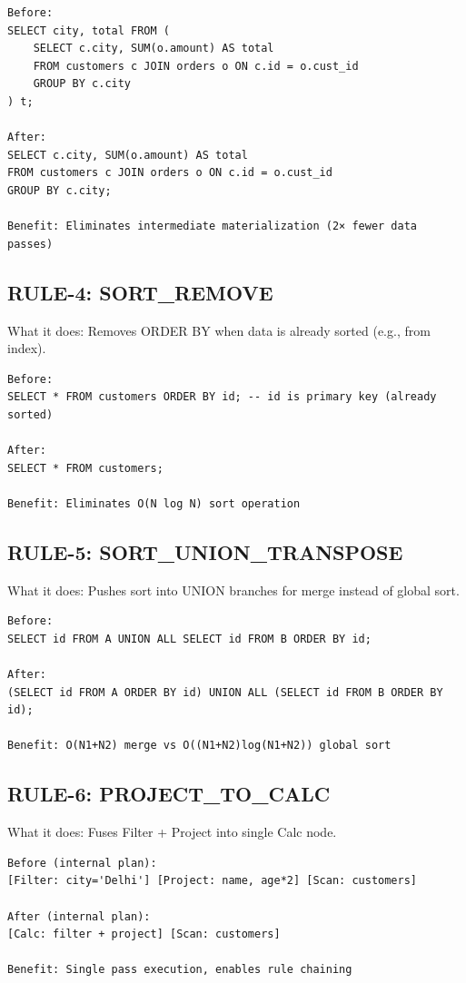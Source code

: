 \documentclass[12pt,a4paper]{article}
\begin{document}
\begin{verbatim}
Before:
SELECT city, total FROM (
    SELECT c.city, SUM(o.amount) AS total
    FROM customers c JOIN orders o ON c.id = o.cust_id
    GROUP BY c.city
) t;

After:
SELECT c.city, SUM(o.amount) AS total
FROM customers c JOIN orders o ON c.id = o.cust_id
GROUP BY c.city;

Benefit: Eliminates intermediate materialization (2× fewer data passes)
\end{verbatim}

\subsection{RULE-4: SORT\_REMOVE}
What it does: Removes ORDER BY when data is already sorted (e.g., from index).

\begin{verbatim}
Before:
SELECT * FROM customers ORDER BY id; -- id is primary key (already sorted)

After:
SELECT * FROM customers;

Benefit: Eliminates O(N log N) sort operation
\end{verbatim}

\subsection{RULE-5: SORT\_UNION\_TRANSPOSE}
What it does: Pushes sort into UNION branches for merge instead of global sort.

\begin{verbatim}
Before:
SELECT id FROM A UNION ALL SELECT id FROM B ORDER BY id;

After:
(SELECT id FROM A ORDER BY id) UNION ALL (SELECT id FROM B ORDER BY id);

Benefit: O(N1+N2) merge vs O((N1+N2)log(N1+N2)) global sort
\end{verbatim}

\subsection{RULE-6: PROJECT\_TO\_CALC}
What it does: Fuses Filter + Project into single Calc node.

\begin{verbatim}
Before (internal plan):
[Filter: city='Delhi'] [Project: name, age*2] [Scan: customers]

After (internal plan):
[Calc: filter + project] [Scan: customers]

Benefit: Single pass execution, enables rule chaining
\end{verbatim}
\end{document}
